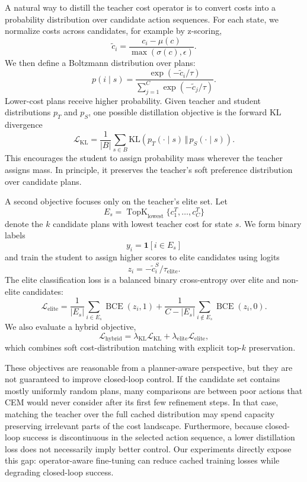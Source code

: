 \documentclass[11pt]{article}
\begin{document}
A natural way to distill the teacher cost operator is to convert costs into a probability distribution over candidate action sequences. For each state, we normalize costs across candidates, for example by z-scoring,
\[
    \tilde c_i
    =
    \frac{c_i - \mu(c)}{\max(\sigma(c), \epsilon)}.
\]
We then define a Boltzmann distribution over plans:
\[
    p(i \mid s)
    =
    \frac{\exp(-\tilde c_i/\tau)}
    {\sum_{j=1}^C \exp(-\tilde c_j/\tau)}.
\]
Lower-cost plans receive higher probability. Given teacher and student distributions $p_T$ and $p_S$, one possible distillation objective is the forward KL divergence
\[
    \mathcal{L}_{\mathrm{KL}}
    =
    \frac{1}{|B|}
    \sum_{s \in B}
    \mathrm{KL}\!\left(
        p_T(\cdot \mid s)
        \,\Vert\,
        p_S(\cdot \mid s)
    \right).
\]
This encourages the student to assign probability mass wherever the teacher assigns mass. In principle, it preserves the teacher's soft preference distribution over candidate plans.

A second objective focuses only on the teacher's elite set. Let
\[
    E_s = \operatorname{TopK}_{\mathrm{lowest}}\{c_1^T,\dots,c_C^T\}
\]
denote the $k$ candidate plans with lowest teacher cost for state $s$. We form binary labels
\[
    y_i = \mathbf{1}[i \in E_s]
\]
and train the student to assign higher scores to elite candidates using logits
\[
    z_i = -\tilde c_i^S/\tau_{\mathrm{elite}}.
\]
The elite classification loss is a balanced binary cross-entropy over elite and non-elite candidates:
\[
    \mathcal{L}_{\mathrm{elite}}
    =
    \frac{1}{|E_s|}
    \sum_{i \in E_s}
    \operatorname{BCE}(z_i,1)
    +
    \frac{1}{C-|E_s|}
    \sum_{i \notin E_s}
    \operatorname{BCE}(z_i,0).
\]
We also evaluate a hybrid objective,
\[
    \mathcal{L}_{\mathrm{hybrid}}
    =
    \lambda_{\mathrm{KL}}\mathcal{L}_{\mathrm{KL}}
    +
    \lambda_{\mathrm{elite}}\mathcal{L}_{\mathrm{elite}},
\]
which combines soft cost-distribution matching with explicit top-$k$ preservation.

These objectives are reasonable from a planner-aware perspective, but they are not guaranteed to improve closed-loop control. If the candidate set contains mostly uniformly random plans, many comparisons are between poor actions that CEM would never consider after its first few refinement steps. In that case, matching the teacher over the full cached distribution may spend capacity preserving irrelevant parts of the cost landscape. Furthermore, because closed-loop success is discontinuous in the selected action sequence, a lower distillation loss does not necessarily imply better control. Our experiments directly expose this gap: operator-aware fine-tuning can reduce cached training losses while degrading closed-loop success.
\end{document}
